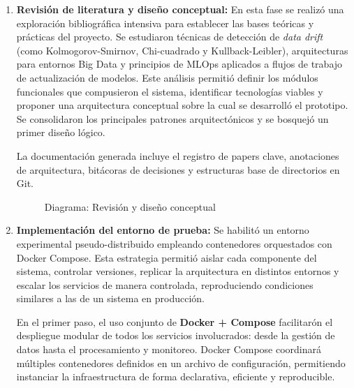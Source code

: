 \begin{enumerate}
    \item \textbf{Revisión de literatura y diseño conceptual:}
    En esta fase se realizó una exploración bibliográfica intensiva para establecer las bases teóricas y prácticas del proyecto. Se estudiaron técnicas de detección de \textit{data drift} (como Kolmogorov-Smirnov, Chi-cuadrado y Kullback-Leibler), arquitecturas para entornos Big Data y principios de MLOps aplicados a flujos de trabajo de actualización de modelos. Este análisis permitió definir los módulos funcionales que compusieron el sistema, identificar tecnologías viables y proponer una arquitectura conceptual sobre la cual se desarrolló el prototipo. Se consolidaron los principales patrones arquitectónicos y se bosquejó un primer diseño lógico.

    La documentación generada incluye el registro de papers clave, anotaciones de arquitectura, bitácoras de decisiones y estructuras base de directorios en Git.
    
    \begin{figure}[H]
    \centering
    \caption{Diagrama: Revisión y diseño conceptual}
    \end{figure}

    \item \textbf{Implementación del entorno de prueba:}
    Se habilitó un entorno experimental pseudo-distribuido empleando contenedores orquestados con Docker Compose. Esta estrategia permitió aislar cada componente del sistema, controlar versiones, replicar la arquitectura en distintos entornos y escalar los servicios de manera controlada, reproduciendo condiciones similares a las de un sistema en producción.
    
    En el primer paso, el uso conjunto de \textbf{Docker + Compose} facilitarón el despliegue modular de todos los servicios involucrados: desde la gestión de datos hasta el procesamiento y monitoreo. Docker Compose coordinará múltiples contenedores definidos en un archivo de configuración, permitiendo instanciar la infraestructura de forma declarativa, eficiente y reproducible.
    

\end{enumerate}
